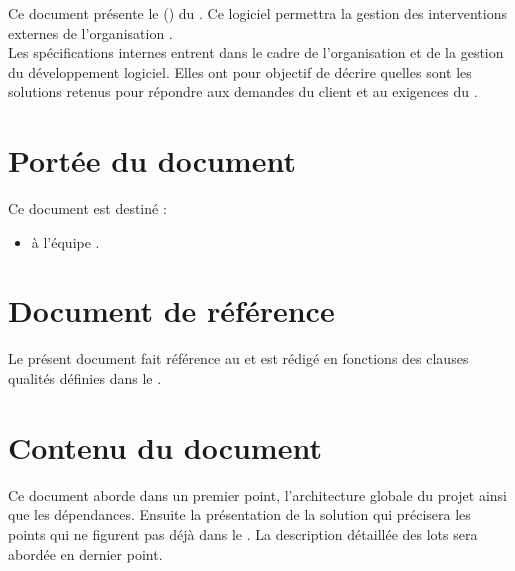 Ce document présente le \DSI{} (\DSICourt) du \PIC{} \nomPIC. Ce logiciel permettra la gestion des interventions externes de l'organisation \nomClient. \\

	Les spécifications internes entrent dans le cadre de l'organisation et de la gestion du développement logiciel. Elles ont pour objectif de décrire quelles sont les solutions retenus pour répondre aux demandes du client et au exigences du \DSECourt{}. 
	
\section*{Portée du document}
	Ce document est destiné :
	\begin{itemize}
		\item à l'équipe \PICCourt{} \nomEquipe.
	\end{itemize}
	
\section*{Document de référence}
	Le présent document fait référence au \DSE{} et est rédigé en fonctions des clauses qualités définies dans le \PQ.
	
\section*{Contenu du document}
	Ce document aborde dans un premier point, l'architecture globale du projet ainsi que les dépendances. Ensuite la présentation de la solution qui précisera les points qui ne figurent pas déjà dans le \DSECourt{}. La description détaillée des lots sera abordée en dernier point.